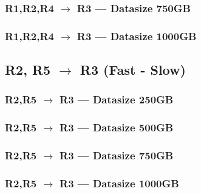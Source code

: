 \newpage
\subsubsection{R1,R2,R4 $\rightarrow$ R3 --- Datasize 750GB}



\newpage
\subsubsection{R1,R2,R4 $\rightarrow$ R3 --- Datasize 1000GB}



\newpage

\subsection{R2, R5 $\rightarrow$ R3 (Fast - Slow)}
\subsubsection{R2,R5 $\rightarrow$ R3 --- Datasize 250GB}



\newpage
\subsubsection{R2,R5 $\rightarrow$ R3 --- Datasize 500GB}



\newpage
\subsubsection{R2,R5 $\rightarrow$ R3 --- Datasize 750GB}



\newpage
\subsubsection{R2,R5 $\rightarrow$ R3 --- Datasize 1000GB}



